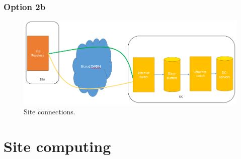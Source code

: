 \documentclass[12pt,a4paper]{article}
\begin{document}
\subsubsection{Option 2b}
\label{sssec:option2b}
\begin{figure}[h]
\centering
\includegraphics[width=\textwidth]{photon_option_2b.png}
\caption{Site connections.\label{fig:option_2b}
}
\end{figure}

\section{Site computing}
\label{sec:site-comp}

\newpage
{}

\end{document}
